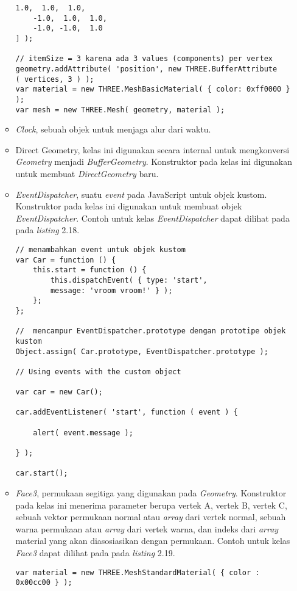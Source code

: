 \begin{itemize}
\begin{itemize}
\begin{lstlisting}[caption={Contoh instansiasi kelas {\it BufferGeometry} dengan membuat bentuk kotak sederhana.},captionpos=b]
	 1.0,  1.0,  1.0,
	-1.0,  1.0,  1.0,
	-1.0, -1.0,  1.0
] );

// itemSize = 3 karena ada 3 values (components) per vertex
geometry.addAttribute( 'position', new THREE.BufferAttribute
( vertices, 3 ) );
var material = new THREE.MeshBasicMaterial( { color: 0xff0000 } );
var mesh = new THREE.Mesh( geometry, material );
\end{lstlisting}

	\item{\it Clock}, sebuah objek untuk menjaga alur dari waktu.
	\item{Direct Geometry}, kelas ini digunakan secara internal untuk mengkonversi {\it Geometry} menjadi {\it BufferGeometry}. Konstruktor pada kelas ini digunakan untuk membuat {\it DirectGeometry} baru.
	\item{\it EventDispatcher}, suatu {\it event} pada JavaScript untuk objek kustom. Konstruktor pada kelas ini digunakan untuk membuat objek {\it EventDispatcher}. Contoh untuk kelas {\it EventDispatcher} dapat dilihat pada pada {\it listing} 2.18.
\begin{lstlisting}[caption={Contoh penggunaan objek {\it EventDispatcher} untuk objek kustom.},captionpos=b]
// menambahkan event untuk objek kustom
var Car = function () {
    this.start = function () {
        this.dispatchEvent( { type: 'start',
        message: 'vroom vroom!' } );
    };
};

//  mencampur EventDispatcher.prototype dengan prototipe objek kustom
Object.assign( Car.prototype, EventDispatcher.prototype );

// Using events with the custom object

var car = new Car();

car.addEventListener( 'start', function ( event ) {

    alert( event.message );

} );

car.start();
\end{lstlisting}

	\item{\it Face3}, permukaan segitiga yang digunakan pada {\it Geometry}. Konstruktor pada kelas ini menerima parameter berupa vertek A, vertek B, vertek C, sebuah vektor permukaan normal atau {\it array} dari vertek normal, sebuah warna permukaan atau {\it array} dari vertek warna, dan indeks dari {\it array} material yang akan diasosiasikan dengan permukaan. Contoh untuk kelas {\it Face3} dapat dilihat pada pada {\it listing} 2.19.
\begin{lstlisting}[caption={Contoh penggunaan {\it Face3} pada suatu {\it Geometry}.},captionpos=b]
var material = new THREE.MeshStandardMaterial( { color : 0x00cc00 } );


\end{lstlisting}
\end{itemize}
\end{itemize}
